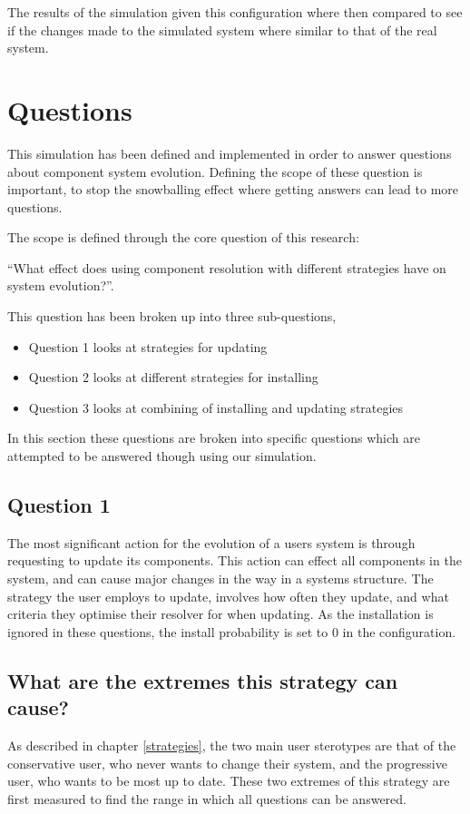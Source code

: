 The results of the simulation given this configuration where then compared to see if the changes made to the simulated system where similar to that of the real system.

\section{Questions}
This simulation has been defined and implemented in order to answer questions about component system evolution.
Defining the scope of these question is important, to stop the snowballing effect where getting answers can lead to more questions. 

The scope is defined through the core question of this research:

``What effect does using component resolution with different strategies have on system evolution?''.

This question has been broken up into three sub-questions,
\begin{itemize}
  \item Question 1 looks at strategies for updating
  \item Question 2 looks at different strategies for installing
  \item Question 3 looks at combining of installing and updating strategies
\end{itemize}

In this section these questions are broken into specific questions which are attempted to be answered though using our simulation.

\subsection{Question 1}
The most significant action for the evolution of a users system is through requesting to update its components.
This action can effect all components in the system, and can cause major changes in the way in a systems structure.
The strategy the user employs to update, involves how often they update, and what criteria they optimise their resolver for when updating.
As the installation is ignored in these questions, the install probability is set to 0 in the configuration.


\subsection{What are the extremes this strategy can cause?}
As described in chapter \ref{strategies}, the two main user sterotypes are that of the conservative user, who never wants to change their system,
and the progressive user, who wants to be most up to date.
These two extremes of this strategy are first measured to find the range in which all questions can be answered.

